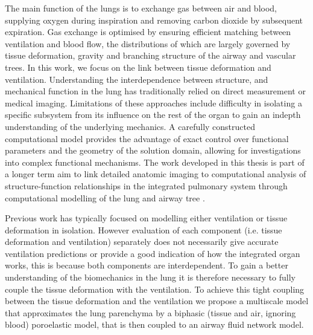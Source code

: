 
The main function of the lungs is to exchange gas between air and blood, supplying oxygen during inspiration and removing carbon dioxide by subsequent expiration. Gas exchange is optimised by ensuring efficient matching between ventilation and blood flow, the distributions of which are largely governed by tissue deformation, gravity and branching structure of the airway and vascular trees. In this work, we focus on the link between tissue deformation and ventilation. Understanding the interdependence between structure, and mechanical function in the lung has traditionally relied on direct measurement or medical imaging. Limitations of these approaches include difficulty in isolating a specific subsystem from its influence on the rest of the organ to gain an indepth understanding of the underlying mechanics. A carefully constructed computational model provides the advantage of exact control over functional parameters and the geometry of the solution domain, allowing for investigations into complex functional mechanisms. The work developed in this thesis is part of a longer term aim to link detailed anatomic imaging to computational analysis of structure-function relationships in the integrated pulmonary system through computational modelling of the lung and airway tree \citep{tawhai2006imaging}. 

Previous work has typically focused on modelling either ventilation or tissue deformation in isolation. However evaluation of each component (i.e. tissue deformation and ventilation) separately does not necessarily give accurate ventilation predictions or provide a good indication of how the integrated organ works, this is because both components are interdependent. To gain a better understanding of the biomechanics in the lung it is therefore necessary to fully couple the tissue deformation with the ventilation. To achieve this tight coupling between the tissue deformation and the ventilation we propose a multiscale model that approximates the lung parenchyma by a biphasic (tissue and air, ignoring blood) poroelastic model, that is then coupled to an airway fluid network model. 

